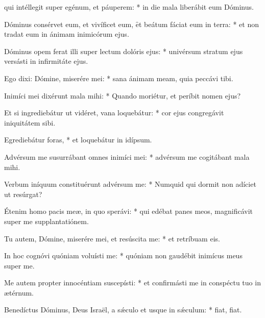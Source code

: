 \begin{psalmus}
    
      qui intéllegit super egénum, et páuperem: * in die mala liberábit eum Dóminus.
		 
		 Dóminus consérvet eum, et vivíficet eum, \f et beátum fáciat eum in terra: * et non tradat eum in ánimam inimicórum ejus.
		 
		 Dóminus opem ferat illi super lectum dolóris ejus: * univérsum stratum ejus versásti in infirmitáte ejus.
		 
		 Ego dixi: Dómine, miserére mei: * sana ánimam meam, quia peccávi tibi.
		 
		 Inimíci mei dixérunt mala mihi: * Quando moriétur, et períbit nomen ejus?
		 
		 Et si ingrediebátur ut vidéret, vana loquebátur: * cor ejus congregávit iniquitátem sibi.
		 
		 Egrediebátur foras, * et loquebátur in idípsum.
		 
		 Advérsum me susurrábant omnes inimíci mei: * advérsum me cogitábant mala mihi.
		 
		 Verbum iníquum constituérunt advérsum me: * Numquid qui dormit non adíciet ut resúrgat?
		 
		 Étenim homo pacis meæ, in quo sperávi: * qui edébat panes meos, magnificávit super me supplantatiónem.
		 
		 Tu autem, Dómine, miserére mei, et resúscita me: * et retríbuam eis.
		 
		 In hoc cognóvi quóniam voluísti me: * quóniam non gaudébit inimícus meus super me.
		 
		 Me autem propter innocéntiam suscepísti: * et confirmásti me in conspéctu tuo in ætérnum.
		 
		 Benedíctus Dóminus, Deus Israël, a sǽculo et usque in sǽculum: * fiat, fiat.

    \end{psalmus}
